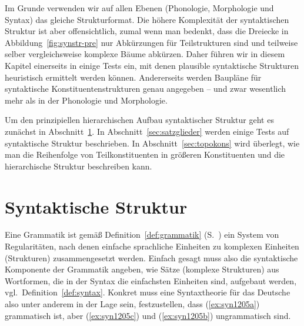 Im Grunde verwenden wir auf allen Ebenen (Phonologie, Morphologie und Syntax) das gleiche Strukturformat.
Die höhere Komplexität der syntaktischen Struktur ist aber offensichtlich, zumal wenn man bedenkt, dass die Dreiecke in Abbildung~\ref{fig:synstr-pre} nur Abkürzungen für Teilstrukturen sind und teilweise selber vergleichsweise komplexe Bäume abkürzen.
Daher führen wir in diesem Kapitel einerseits in einige Tests ein, mit denen plausible syntaktische Strukturen heuristisch ermittelt werden können.
Andererseits werden Baupläne für syntaktische Konstituentenstrukturen genau angegeben -- und zwar wesentlich mehr als in der Phonologie und Morphologie.

Um den prinzipiellen hierarchischen Aufbau syntaktischer Struktur geht es zunächst in Abschnitt~\ref{sec:syntaktischestruktur}.
In Abschnitt~\ref{sec:satzglieder} werden einige Tests auf syntaktische Struktur beschrieben.
In Abschnitt~\ref{sec:topokons} wird überlegt, wie man die Reihenfolge von Teilkonstituenten in größeren Konstituenten und die hierarchische Struktur beschreiben kann.

\section{Syntaktische Struktur}

\label{sec:syntaktischestruktur}


Eine Grammatik ist gemäß Definition~\ref{def:grammatik} (S.~\pageref{def:grammatik}) ein System von Regularitäten, nach denen einfache sprachliche Einheiten zu komplexen Einheiten (Strukturen) zusammengesetzt werden.
Einfach gesagt muss also die syntaktische Komponente der Grammatik angeben, wie Sätze (komplexe Strukturen) aus Wortformen, die in der Syntax die einfachsten Einheiten sind, aufgebaut werden, vgl.\ Definition~\ref{def:syntax}.
Konkret muss eine Syntaxtheorie für das Deutsche also unter anderem in der Lage sein, festzustellen, dass (\ref{ex:syn1205a}) grammatisch ist, aber (\ref{ex:syn1205c}) und (\ref{ex:syn1205b}) ungrammatisch sind.


\begin{exe}
  \ex\label{ex:syn1205}
  \begin{xlist}
  \end{xlist}
\end{exe}

